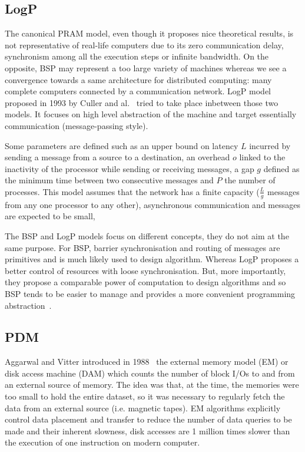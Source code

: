 \subsection{LogP}

The canonical PRAM model, even though it proposes nice theoretical results, is not representative of real-life computers due to its zero communication delay, synchronism among all the execution steps or infinite bandwidth. On the opposite, BSP may represent a too large variety of machines whereas we see a convergence towards a same architecture for distributed computing: many complete computers connected by a communication network. LogP model proposed in 1993 by Culler and al.~\cite{culler1993logp} tried to take place inbetween those two models. It focuses on high level abstraction of the machine and target essentially communication (message-passing style).

Some parameters are defined such as an upper bound on latency $L$ incurred by sending a message from a source to a destination, an overhead $o$ linked to the inactivity of the processor while sending or receiving messages, a gap $g$ defined as the minimum time between two consecutive messages and $P$ the number of processes. This model assumes that the network has a finite capacity ($\frac{L}{g}$ messages from any one processor to any other), asynchronous communication and messages are expected to be small, 

The BSP and LogP models focus on different concepts, they do not aim at the same purpose. For BSP, barrier synchronisation and routing of messages are primitives and is much likely used to design algorithm. Whereas LogP proposes a better control of resources with loose synchronisation. But, more importantly, they propose a comparable power of computation to design algorithms and so BSP tends to be easier to manage and provides a more convenient programming abstraction~\cite{bilardi1999bsp}.

\subsection{PDM}

Aggarwal and Vitter introduced in 1988~\cite{aggarwal1988input} the external memory model (EM) or disk access machine (DAM) which counts the number of block I/Os to and from an external source of memory. The idea was that, at the time, the memories were too small to hold the entire dataset, so it was necessary to regularly fetch the data from an external source (i.e. magnetic tapes). EM algorithms explicitly control data placement and transfer to reduce the number of data queries to be made and their inherent slowness, disk accesses are 1 million times slower than the execution of one instruction on modern computer.

